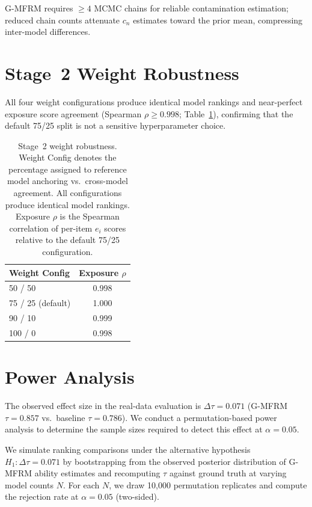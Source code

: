 G-MFRM requires $\geq 4$ MCMC chains for reliable contamination estimation; reduced chain counts attenuate $c_n$ estimates toward the prior mean, compressing inter-model differences.


\section{Stage~2 Weight Robustness}
\label{app:weight_robustness}

All four weight configurations produce identical model rankings and near-perfect exposure score agreement (Spearman $\rho \geq 0.998$; Table~\ref{tab:weight_robustness}), confirming that the default 75/25 split is not a sensitive hyperparameter choice.

\begin{table}[h]
\centering
\small
\begin{tabular}{lc}
\toprule
\textbf{Weight Config} & \textbf{Exposure} $\rho$ \\
\midrule
50 / 50 & 0.998 \\
75 / 25 (default) & 1.000 \\
90 / 10 & 0.999 \\
100 / 0 & 0.998 \\
\bottomrule
\end{tabular}
\caption{Stage~2 weight robustness. Weight Config denotes the percentage assigned to reference model anchoring vs.\ cross-model agreement. All configurations produce identical model rankings. Exposure $\rho$ is the Spearman correlation of per-item $e_i$ scores relative to the default 75/25 configuration.}
\label{tab:weight_robustness}
\end{table}


\section{Power Analysis}
\label{app:power}

The observed effect size in the real-data evaluation is $\Delta\tau = 0.071$ (G-MFRM $\tau = 0.857$ vs.\ baseline $\tau = 0.786$). We conduct a permutation-based power analysis to determine the sample sizes required to detect this effect at $\alpha = 0.05$.

We simulate ranking comparisons under the alternative hypothesis $H_1\!: \Delta\tau = 0.071$ by bootstrapping from the observed posterior distribution of G-MFRM ability estimates and recomputing $\tau$ against ground truth at varying model counts $N$. For each $N$, we draw 10{,}000 permutation replicates and compute the rejection rate at $\alpha = 0.05$ (two-sided).

